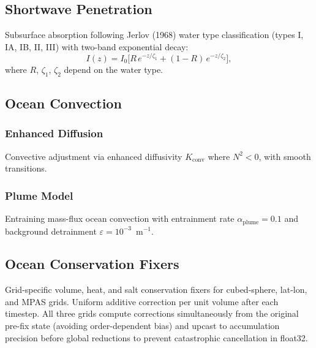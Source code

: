 \documentclass[11pt,a4paper]{article}
\begin{document}
\subsection{Shortwave Penetration}

Subsurface absorption following Jerlov (1968) water type classification (types I, IA, IB, II, III) with two-band exponential decay:
\begin{equation}
  I(z) = I_0\bigl[R\,e^{-z/\zeta_1} + (1-R)\,e^{-z/\zeta_2}\bigr],
\end{equation}
where $R$, $\zeta_1$, $\zeta_2$ depend on the water type.

\subsection{Ocean Convection}

\subsubsection{Enhanced Diffusion}
Convective adjustment via enhanced diffusivity $K_{\mathrm{conv}}$ where $N^2<0$, with smooth transitions.

\subsubsection{Plume Model}
Entraining mass-flux ocean convection with entrainment rate $\alpha_{\mathrm{plume}}=0.1$ and background detrainment $\varepsilon=10^{-3}$~m$^{-1}$.

\subsection{Ocean Conservation Fixers}

Grid-specific volume, heat, and salt conservation fixers for cubed-sphere, lat-lon, and MPAS grids.  Uniform additive correction per unit volume after each timestep.  All three grids compute corrections simultaneously from the original pre-fix state (avoiding order-dependent bias) and upcast to accumulation precision before global reductions to prevent catastrophic cancellation in float32.
\end{document}
